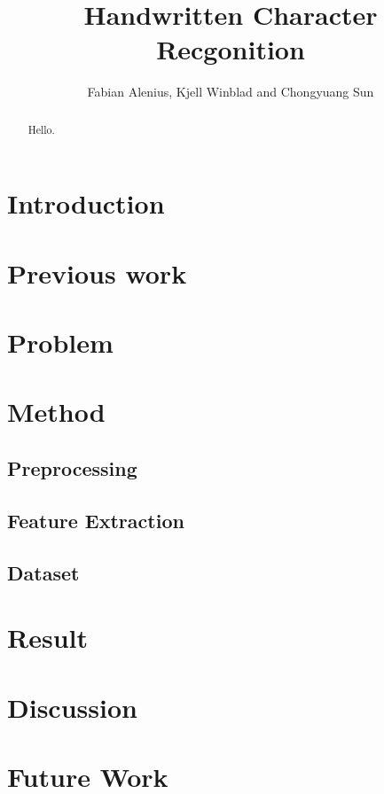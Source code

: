 \documentclass[11pt]{article}
\author{Fabian Alenius, Kjell Winblad and Chongyuang Sun} \title{Handwritten Character Recgonition}
\begin{document}
\maketitle

\begin{abstract}
Hello.

\end{abstract}

\section{Introduction}
\cite{trec}

\section{Previous work}

\section{Problem}

\section{Method}

\subsection{Preprocessing}

\subsection{Feature Extraction}

\subsection{Dataset}\label{sec:dataset}


\section{Result}\label{sec:result}


\section{Discussion}

\section{Future Work}


\end{document}
